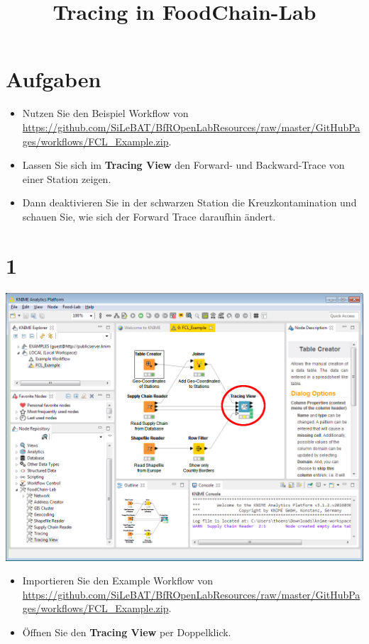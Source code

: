 \documentclass{beamer}
\title{Tracing in FoodChain-Lab}
\date{}
\begin{document}
\maketitle

\section{Aufgaben}
\begin{frame}
	\begin{itemize}
		\item Nutzen Sie den Beispiel Workflow von \url{https://github.com/SiLeBAT/BfROpenLabResources/raw/master/GitHubPages/workflows/FCL_Example.zip}.
		\item Lassen Sie sich im \textbf{Tracing View} den Forward- und Backward-Trace von einer Station zeigen.
    
		\item Dann deaktivieren Sie in der schwarzen Station die Kreuzkontamination und schauen Sie, wie sich der Forward Trace daraufhin ändert.
	\end{itemize}
\end{frame}

\section{1}
\begin{frame}
	\begin{center}
  		\includegraphics[height=0.6\textheight]{1.png}
	\end{center}
	\begin{itemize}
		\item Importieren Sie den Example Workflow von \url{https://github.com/SiLeBAT/BfROpenLabResources/raw/master/GitHubPages/workflows/FCL_Example.zip}.
		\item Öffnen Sie den \textbf{Tracing View} per Doppelklick.
	\end{itemize}
\end{frame}
\end{document}

